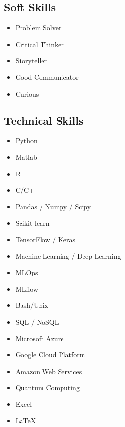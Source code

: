 \documentclass[11pt,a4paper,sans]{moderncv}        %
\begin{document}
\subsection{Soft Skills}
\vspace{-1.25em}
\begin{multicols}{2}
\begin{itemize}
\item Problem Solver
\item Critical Thinker
\item Storyteller
\item Good Communicator 
\item Curious
\end{itemize}
\end{multicols}

\subsection{Technical Skills}
\vspace{-1.25em}
\begin{multicols}{2}
\begin{itemize}
\item Python  \hfill {}
\item Matlab  \hfill {}
\item R  \hfill {}
\item C/C++  \hfill {}
\item Pandas / Numpy / Scipy \hfill {}
\item Scikit-learn \hfill {}
\item TensorFlow / Keras \hfill {}
\item Machine Learning / Deep Learning \hfill {}
\item MLOps \hfill {}
\item MLflow \hfill {}
\item Bash/Unix \hfill {}
\item SQL / NoSQL \hfill {}
\item Microsoft Azure \hfill {}
\item Google Cloud Platform \hfill {}
\item Amazon Web Services \hfill {}
\item Quantum Computing  \hfill {}
\item Excel \hfill {}
\item \LaTeX \hfill {}
\end{itemize}
\end{multicols}
\end{document}
